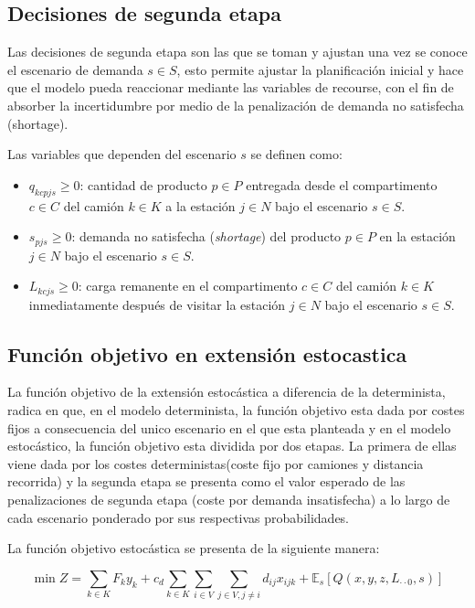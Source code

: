 \subsection{Decisiones de segunda etapa}
Las decisiones de segunda etapa son las que se toman y ajustan una vez se conoce el escenario de demanda ${s} \in {S}$, esto permite ajustar la planificación inicial y hace que el modelo pueda reaccionar mediante las variables de recourse, con el fin de absorber la incertidumbre por medio de la penalización de demanda no satisfecha (shortage).

Las variables que dependen del escenario ${s}$ se definen como:

\begin{itemize}
    \item $q_{kcpjs} \geq 0$: cantidad de producto $p \in P$ entregada desde el compartimento $c \in C$ del camión $k \in K$ a la estación $j \in N$ bajo el escenario $s \in {S}$.

    \item $s_{pjs} \geq 0$: demanda no satisfecha (\textit{shortage}) del producto $p \in P$ en la estación $j \in N$ bajo el escenario $s \in {S}$.

    \item $L_{kcjs} \geq 0$: carga remanente en el compartimento $c \in C$ del camión $k \in K$ inmediatamente después de visitar la estación $j \in N$ bajo el escenario $s \in {S}$.
\end{itemize}

\subsection{Función objetivo en extensión estocastica}

La función objetivo de la extensión estocástica a diferencia de la determinista, radica en que, en el modelo determinista, la función objetivo esta dada por costes fijos a consecuencia del unico escenario en el que esta planteada y en el modelo estocástico, la función objetivo esta dividida por dos etapas. La primera de ellas viene dada por los costes deterministas(coste fijo por camiones y distancia recorrida) y la segunda etapa se presenta como el valor esperado de las penalizaciones de segunda etapa (coste por demanda insatisfecha) a lo largo de cada escenario ponderado por sus respectivas probabilidades.

La función objetivo estocástica se presenta de la siguiente manera:

$$\min Z = \sum_{k \in K} F_k y_k + c_d \sum_{k \in K} \sum_{i \in V} \sum_{j \in V, j \neq i} d_{ij} x_{ijk} + \mathbb{E}_s \left[ Q(x, y, z, L_{\cdot\cdot 0}, s) \right]$$

